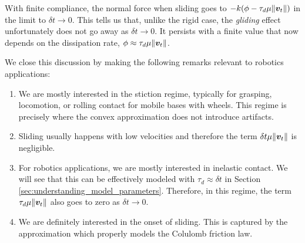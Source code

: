 With finite compliance,  the normal force when sliding goes to
$-k(\phi-\tau_d\mu\Vert{\bm{v}}_t\Vert)$ in the limit to $\delta t\rightarrow 0$. This tells us that, unlike the rigid case, the \textit{gliding}
effect unfortunately does not go away as $\delta t\rightarrow 0$. It persists
with a finite value that now depends on the dissipation rate,
$\phi\approx\tau_d\mu\Vert{\bm{v}}_t\Vert$.

We close this discussion by making the following remarks relevant to robotics
applications:
\begin{enumerate}
	\item We are mostly interested in the stiction
	regime, typically for grasping, locomotion, or rolling contact for mobile
	bases with wheels. This regime is precisely where the convex approximation
	does not introduce artifacts.
	\item Sliding usually happens with low velocities and therefore the term
	$\delta t\mu\Vert{\bm{v}}_t\Vert$ is negligible.
	\item For robotics applications, we are mostly interested in inelastic
	contact. We will see that this can be effectively modeled with
	$\tau_d\approx\delta t$ in Section \ref{sec:understanding_model_parameters}.
	Therefore, in this regime, the term $\tau_d\mu\Vert{\bm{v}}_t\Vert$ also goes
	to zero as $\delta t\rightarrow 0$.
	\item We are definitely interested in the onset of sliding.
	This is captured by the approximation which properly models the Colulomb
	friction law.
\end{enumerate}
